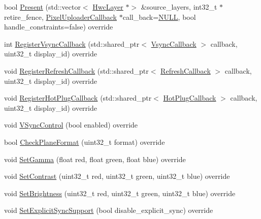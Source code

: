 \begin{DoxyCompactItemize}
\item 
bool \mbox{\hyperlink{classhwcomposer_1_1LogicalDisplay_a2cc998518219938311c9bba35cac4935}{Present}} (std\+::vector$<$ \mbox{\hyperlink{structhwcomposer_1_1HwcLayer}{Hwc\+Layer}} $\ast$$>$ \&source\+\_\+layers, int32\+\_\+t $\ast$retire\+\_\+fence, \mbox{\hyperlink{classhwcomposer_1_1PixelUploaderCallback}{Pixel\+Uploader\+Callback}} $\ast$call\+\_\+back=\mbox{\hyperlink{alios_2platformdefines_8h_a070d2ce7b6bb7e5c05602aa8c308d0c4}{N\+U\+LL}}, bool handle\+\_\+constraints=false) override
\item 
int \mbox{\hyperlink{classhwcomposer_1_1LogicalDisplay_af99c6d2e779060cb006ee5d0039386da}{Register\+Vsync\+Callback}} (std\+::shared\+\_\+ptr$<$ \mbox{\hyperlink{classhwcomposer_1_1VsyncCallback}{Vsync\+Callback}} $>$ callback, uint32\+\_\+t display\+\_\+id) override
\item 
void \mbox{\hyperlink{classhwcomposer_1_1LogicalDisplay_a53dd3b4a4ee95af6a903327519278691}{Register\+Refresh\+Callback}} (std\+::shared\+\_\+ptr$<$ \mbox{\hyperlink{classhwcomposer_1_1RefreshCallback}{Refresh\+Callback}} $>$ callback, uint32\+\_\+t display\+\_\+id) override
\item 
void \mbox{\hyperlink{classhwcomposer_1_1LogicalDisplay_a04e78f9e54b66e91bab3f9744a2a18f3}{Register\+Hot\+Plug\+Callback}} (std\+::shared\+\_\+ptr$<$ \mbox{\hyperlink{classhwcomposer_1_1HotPlugCallback}{Hot\+Plug\+Callback}} $>$ callback, uint32\+\_\+t display\+\_\+id) override
\item 
void \mbox{\hyperlink{classhwcomposer_1_1LogicalDisplay_adfb3b051b8636f58226bc30da8fe1735}{V\+Sync\+Control}} (bool enabled) override
\item 
bool \mbox{\hyperlink{classhwcomposer_1_1LogicalDisplay_ae54b9d9a1d980ed587f43aef1c2a6f2c}{Check\+Plane\+Format}} (uint32\+\_\+t format) override
\item 
void \mbox{\hyperlink{classhwcomposer_1_1LogicalDisplay_aed2d919c0ee7f2eb177e062f0ac3cd1f}{Set\+Gamma}} (float red, float green, float blue) override
\item 
void \mbox{\hyperlink{classhwcomposer_1_1LogicalDisplay_a84a63a9f28391e92765316afacf22402}{Set\+Contrast}} (uint32\+\_\+t red, uint32\+\_\+t green, uint32\+\_\+t blue) override
\item 
void \mbox{\hyperlink{classhwcomposer_1_1LogicalDisplay_a3244bd17dbe005b1e8db94fd646f246f}{Set\+Brightness}} (uint32\+\_\+t red, uint32\+\_\+t green, uint32\+\_\+t blue) override
\item 
void \mbox{\hyperlink{classhwcomposer_1_1LogicalDisplay_aafa5f07e92a828651f2d66b09df4896d}{Set\+Explicit\+Sync\+Support}} (bool disable\+\_\+explicit\+\_\+sync) override
$$
\end{DoxyCompactItemize}
